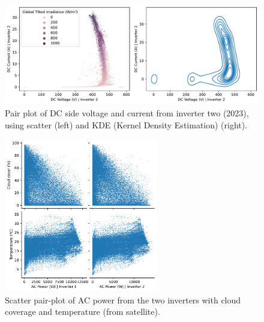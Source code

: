 \begin{figure}[h]
    \centering
    \includegraphics[width=\textwidth]{figures/appendix/b_analysis/07_voltage_current_pairplot_test_2.pdf}
    \caption{Pair plot of DC side voltage and current from inverter two (2023), using scatter (left) and KDE (Kernel Density Estimation) (right).}
    \label{fig:eda_voltage_current_test_2}
\end{figure}

\begin{figure}[h]
    \centering
    \includegraphics[width=0.6\textwidth]{figures/appendix/b_analysis/12_power_meteo_pairplot_kb.pdf}
    \caption{Scatter pair-plot of AC power from the two inverters with cloud coverage and temperature (from satellite).}
    \label{fig:eda_irrelevant_meteo}
\end{figure}

